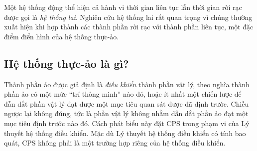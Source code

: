 Một hệ thống động thể hiện cả hành vi thời gian liên tục lẫn thời gian rời rạc được gọi là \emph{hệ thống lai}. Nghiên cứu hệ thống lai rất quan trọng vì chúng thường xuất hiện khi hợp thành các thành phần rời rạc với thành phần liên tục, một đặc điểm điển hình của hệ thống thực-ảo.

\subsection{Hệ thống thực-ảo là gì?}
Thành phần ảo được giả định là \emph{điều khiển} thành phần vật lý, theo nghĩa thành phần ảo có một mức ``trí thông minh'' nào đó, hoặc ít nhất một chiến lược để dẫn dắt phần vật lý đạt được một mục tiêu quan sát được đã định trước. Chiều ngược lại không đúng, tức là phần vật lý không nhằm dẫn dắt phần ảo đạt một mục tiêu định trước nào đó. Cách phát biểu này đặt CPS trong phạm vi của Lý thuyết hệ thống điều khiển. Mặc dù Lý thuyết hệ thống điều khiển có tính bao quát, CPS không phải là một trường hợp riêng của hệ thống điều khiển.

